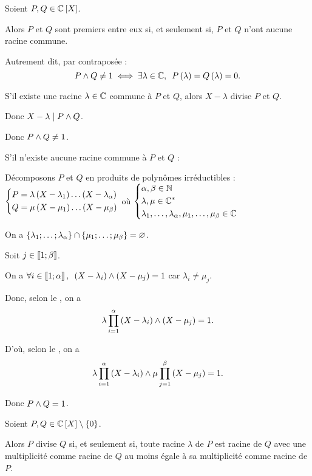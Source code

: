 \begin{prop}
Soient \(P,Q\in\poly[\C]\).

Alors \(P\) et \(Q\) sont premiers entre eux si, et seulement si, \(P\) et \(Q\) n'ont aucune racine commune.

Autrement dit, par contraposée : \[P\et Q\not=1\ssi\quantifs{\exists\lambda\in\C}P\paren{\lambda}=Q\paren{\lambda}=0.\]
\end{prop}

\begin{dem}
S'il existe une racine \(\lambda\in\mathbb{C}\) commune à \(P\) et \(Q\), alors \(X-\lambda\) divise \(P\) et \(Q\).

Donc \(X-\lambda\mid P\land Q\).

Donc \(P\land Q\not=1\).

S'il n'existe aucune racine commune à \(P\) et \(Q\) :

Décomposons \(P\) et \(Q\) en produits de polynômes irréductibles : \(\begin{dcases}P=\lambda\left(X-\lambda_1\right)\dots\left(X-\lambda_\alpha\right) \\ Q=\mu\left(X-\mu_1\right)\dots\left(X-\mu_\beta\right)\end{dcases}\) où \(\begin{dcases}\alpha,\beta\in\mathbb{N} \\ \lambda,\mu\in\mathbb{C}^* \\ \lambda_1,\dots,\lambda_\alpha,\mu_1,\dots,\mu_\beta\in\mathbb{C}\end{dcases}\)

On a \(\left\lbrace\lambda_1;\dots;\lambda_\alpha\right\rbrace\cap\left\lbrace\mu_1;\dots;\mu_\beta\right\rbrace=\varnothing\).

Soit \(j\in\left\llbracket1;\beta\right\rrbracket\).

On a \(\quantifs{\forall i\in\interventierii{1}{\alpha}}\paren{X-\lambda_i}\et\paren{X-\mu_j}=1\) car \(\lambda_i\not=\mu_j\).

Donc, selon le , on a \[\lambda\prod_{i=1}^{\alpha}\left(X-\lambda_i\right)\land\left(X-\mu_j\right)=1.\]

D'où, selon le , on a \[\lambda\prod_{i=1}^{\alpha}\left(X-\lambda_i\right)\land\mu\prod_{j=1}^{\beta}\left(X-\mu_j\right)=1.\]

Donc \(P\land Q=1\).
\end{dem}

\begin{prop}
Soient \(P,Q\in\poly[\C]\excluant\accol{0}\).

Alors \(P\) divise \(Q\) si, et seulement si, toute racine \(\lambda\) de \(P\) est racine de \(Q\) avec une multiplicité comme racine de \(Q\) au moins égale à sa multiplicité comme racine de \(P\).
\end{prop}

